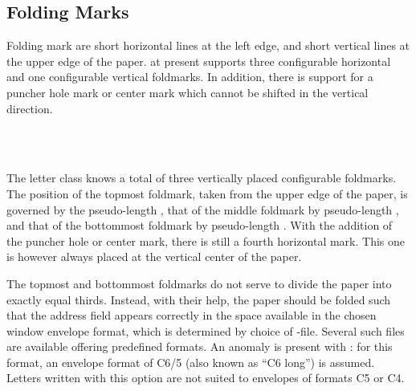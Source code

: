 \subsection{Folding Marks}
\label{sec:scrlttr2-experts.foldmarks}
%

Folding mark are short horizontal lines at the left edge, and short vertical
lines at the upper edge of the paper. \KOMAScript{} at present supports three
configurable horizontal and one configurable vertical foldmarks. In addition,
there is support for a puncher hole mark or center mark which cannot be
shifted in the vertical direction.

\begin{Declaration}
  \\
  \\
\end{Declaration}
%
%
%
The letter class  knows a total of three
vertically placed configurable foldmarks. The position of the topmost
foldmark, taken from the upper edge of the paper, is governed by the
pseudo-length , that of the middle foldmark by
pseudo-length
, and that
of the bottommost foldmark by pseudo-length . With
the addition of the puncher hole or 
center
mark, there is still a fourth horizontal mark. This one is however
always placed at the vertical center of the paper.
\iffalse%
There's no pseudo-length for this last mark, because it vertical position
isn't configurable.
\fi

The topmost and bottommost foldmarks do not serve to
divide the paper into exactly equal thirds. Instead, with their help, the
paper should be folded such that the address field appears correctly in the
space available in the chosen window envelope format, which is determined by
choice of -file. Several such files are available offering
predefined formats. An anomaly is present with : for this
format, an envelope format of C6/5 (also known as ``C6 long'') is
assumed. Letters written with this option are not suited to envelopes of
formats C5 or C4.

